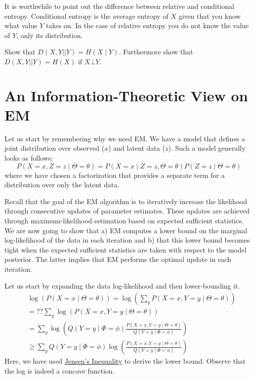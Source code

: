 It is worthwhile to point out the difference between relative and conditional entropy. Conditional entropy is the average entropy of $ X $ given that you
know what value $ Y $ takes on. In the case of relative entropy you do not know the value of $ Y $, only its distribution.

\begin{Exercise}
Show that $ D(X,Y||Y) = H(X \mid Y) $. Furthermore show that $ D(X,Y||Y) = H(X) $ if $ X\bot Y $.
\end{Exercise}


\section{An Information-Theoretic View on EM}

Let us start by remembering why we need EM. We have a model that defines a joint distribution
over observed ($ x $) and latent data ($ z $). Such a model generally looks as follows:
\begin{equation}
P(X=x, Z=z  \mid  \Theta = \theta) = P(X=x \mid Z=z, \Theta=\theta) P(Z=z \mid \Theta = \theta)
\end{equation}
where we have chosen a factorization that provides a separate term for a distribution over only the
latent data.

Recall that the goal of the EM algorithm is to iteratively increase the likelihood through consecutive
updates of parameter estimates. These updates are achieved through maximum-likelihood estimation based
on expected sufficient statistics. We are now going to show that a) EM computes a lower bound on the
marginal log-likelihood of the data in each iteration and b) that this lower bound becomes tight when the
expected sufficient statistics are taken with respect to the model posterior. The latter implies that
EM performs the optimal update in each iteration.

Let us start by expanding the data log-likelihood and then lower-bounding it.
\begin{align}
&\log(P(X=x \mid \Theta=\theta)) = \log(\sum_y P(X=x, Y=y \mid  \Theta = \theta))  \\
&=?? \sum_{y} \log(P(X=x, Y=y \mid  \Theta = \theta))  \\
&= \sum_{y} \log\left(Q(Y=y \mid \Phi=\phi)\frac{P(X=x, Y=y \mid  \Theta = \theta)}{Q(Y=y \mid \Phi=\phi)}\right) \\
&\geq \sum_{y} Q(Y=y \mid \Phi=\phi) \log\left(\frac{P(X=x, Y=y \mid  \Theta = \theta)}{Q(Y=y \mid \Phi=\phi)}\right)
\label{eq:ELBO1}
\end{align}
Here, we have used \href{https://en.wikipedia.org/wiki/Jensen\%27s_inequality}{Jensen's Inequality} to
derive the lower bound. Observe that the log is indeed a concave function. 

